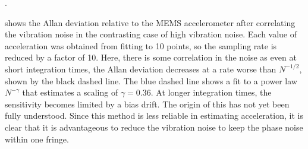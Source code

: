 \nocite{Meunier2015, Fang2016, Dick1990}.
\par\noindent
{} shows the Allan deviation relative to the
MEMS accelerometer after
correlating the vibration noise in the
contrasting case of
high vibration noise. Each value of acceleration was obtained from
fitting to 10 points, so the sampling rate is reduced by a factor of
10. Here, there is some correlation in the noise as even at short
integration times, the Allan deviation decreases at a rate worse than
$N^{-1/2}$, shown by the black dashed line. The blue dashed line
shows a fit to a power law $N^{-\gamma}$ that estimates a scaling
of $\gamma = 0.36$. At longer integration times, the sensitivity
becomes limited by a bias drift. The origin of this has not yet been
fully understood. Since this method is less reliable in estimating
acceleration, it is clear that it is advantageous to reduce the
vibration noise to keep the phase noise within one fringe. 
